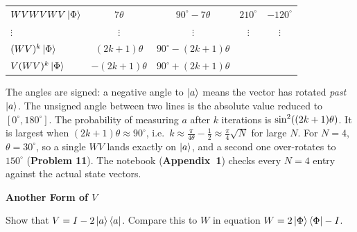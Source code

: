 \documentclass[a4paper, 10pt]{article}
\begin{document}
\begin{solution}
\begin{center}
\begin{tabular}{lcccc}
			\( WVWVWV\ket{\Phi} \)  & \( 7\theta \)                & \( 90^\circ - 7\theta \)        & \( 210^\circ \)                     & \( -120^\circ \)              \\
			\( \vdots \)            & \( \vdots \)                 & \( \vdots \)                    & \( \vdots \)                        & \( \vdots \)                  \\
			\( (WV)^k\ket{\Phi} \)  & \( (2k + 1)\theta \)         & \( 90^\circ - (2k + 1)\theta \) &                                     &                               \\
			\( V(WV)^k\ket{\Phi} \) & \( -(2k + 1)\theta \)        & \( 90^\circ + (2k + 1)\theta \) &                                     &                               \\
			\bottomrule
		\end{tabular}
	\end{center}
	The angles are signed: a negative angle to \( \ket{a} \) means the vector has rotated \emph{past} \( \ket{a} \). The unsigned angle between two lines is the absolute value reduced to \( [0^\circ, 180^\circ] \).
	The probability of measuring \( a \) after \( k \) iterations is \( \sin^2\!\left((2k + 1)\theta\right) \). It is largest when \( (2k + 1)\theta \approx 90^\circ \), i.e.\ \( k \approx \tfrac{\pi}{4\theta} - \tfrac{1}{2} \approx \tfrac{\pi}{4}\sqrt{N} \) for large \( N \).
	For \( N = 4 \), \( \theta = 30^\circ \), so a single \( WV \) lands exactly on \( \ket{a} \), and a second one over-rotates to \( 150^\circ \) (\textbf{Problem 11}).
	The notebook (\textbf{Appendix~1}) checks every \( N = 4 \) entry against the actual state vectors.
\end{solution}

\begin{problem}
\textbf{Another Form of \( V \)}
\par Show that \( V = I - 2 \ket{a}\bra{a} \).
Compare this to \( W \) in equation \( W = 2\ket{\Phi}\bra{\Phi} - I \).
\end{problem}
\end{document}
